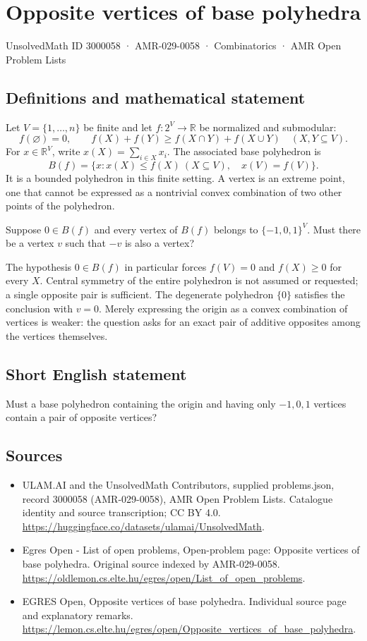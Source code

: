 \documentclass[11pt,a4paper]{article}
\begin{document}
\section*{Opposite vertices of base polyhedra}\label{3000058}
{\small UnsolvedMath ID 3000058 · AMR-029-0058 · Combinatorics · AMR Open Problem Lists}
\subsection{Definitions and mathematical statement}
Let $V=\{1,\ldots,n\}$ be finite and let $f:2^V\to\mathbb R$ be
normalized and submodular:
\[
 f(\varnothing)=0,\qquad
 f(X)+f(Y)\ge f(X\cap Y)+f(X\cup Y)\quad(X,Y\subseteq V).
\]
For $x\in\mathbb R^V$, write $x(X)=\sum_{i\in X}x_i$.
The associated base polyhedron is
\[
            B(f)=\{x:x(X)\le f(X)\ (X\subseteq V),\quad x(V)=f(V)\}.
\]
It is a bounded polyhedron in this finite setting. A vertex is an
extreme point, one that cannot be expressed as a nontrivial convex
combination of two other points of the polyhedron.

Suppose $0\in B(f)$ and every vertex of $B(f)$ belongs to
$\{-1,0,1\}^V$. Must there be a vertex $v$ such that $-v$ is also
a vertex?

The hypothesis $0\in B(f)$ in particular forces $f(V)=0$ and
$f(X)\ge0$ for every $X$. Central symmetry of the entire polyhedron
is not assumed or requested; a single opposite pair is sufficient.
The degenerate polyhedron $\{0\}$ satisfies the conclusion with
$v=0$. Merely expressing the origin as a convex combination of
vertices is weaker: the question asks for an exact pair of additive
opposites among the vertices themselves.
\subsection{Short English statement}
Must a base polyhedron containing the origin and having only
$-1,0,1$ vertices contain a pair of opposite vertices?
\subsection{Sources}
\begin{itemize}
\item[S1] ULAM.AI and the UnsolvedMath Contributors, supplied problems.json, record 3000058 (AMR-029-0058), AMR Open Problem Lists. Catalogue identity and source transcription; CC BY 4.0.
\url{https://huggingface.co/datasets/ulamai/UnsolvedMath}.
\item[S2] Egres Open - List of open problems, Open-problem page: Opposite vertices of base polyhedra. Original source indexed by AMR-029-0058.
\url{https://oldlemon.cs.elte.hu/egres/open/List_of_open_problems}.
\item[S3] EGRES Open, Opposite vertices of base polyhedra. Individual source page and explanatory remarks.
\url{https://lemon.cs.elte.hu/egres/open/Opposite_vertices_of_base_polyhedra}.
\end{itemize}
\end{document}
